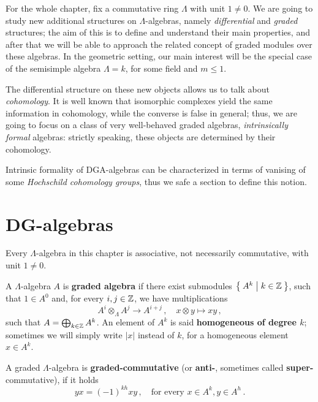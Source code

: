 
For the whole chapter, fix a commutative ring $\Lambda$ 
with unit $1 \ne 0$. We are going to study new
additional structures on $\Lambda$-algebras, 
namely \emph{differential} and \emph{graded} structures;
the aim of this is to define and understand their main properties,
and after that we will be able to
approach the related concept of graded modules over these algebras. 
In the geometric setting, our main interest will be the special case
of the semisimple algebra $\Lambda = k$,
for some field and $m \le 1$.

The differential structure on these new objects
allows us to talk about \emph{cohomology}.
It is well known that isomorphic complexes
yield the same information in cohomology,
while the converse is false in general;
thus, we are going to focus on a class of very well-behaved 
graded algebras, \emph{intrinsically formal} algebras:
strictly speaking, these objects are determined
by their cohomology. 

Intrinsic formality of DGA-algebras
can be characterized in terms of vanising
of some \emph{Hochschild cohomology groups},
thus we safe a section to define this notion.

\section{DG-algebras}

	Every $\Lambda$-algebra in this chapter is associative,
	not necessarily commutative,
	with unit $1 \ne 0$.
	
	\begin{df}
		A $\Lambda$-algebra $A$ is \textbf{graded algebra}
		if there exist submodules $\Set{A^{k} | k \in {\mathbb Z}}$,
		such that $1 \in A^{0}$ and,
		for every $i,j \in {\mathbb Z}$, we have multiplications
		\begin{equation*}
			A^{i} \otimes_{\Lambda} A^{j} \longrightarrow A^{i+j}\,,
			\quad x \otimes y \longmapsto xy\,,
		\end{equation*}
		such that $A = \bigoplus_{k \in {\mathbb Z}} A^{k}$.
		An element of $A^{k}$ is said \textbf{homogeneous of degree $k$};
		sometimes we will simply write $|x|$ instead of $k$,
		for a homogeneous element $x \in A^{k}$.
		
		A graded $\Lambda$-algebra is \textbf{graded-commutative} 
		(or \textbf{anti-}, sometimes called \textbf{super-}commutative),
		if it holds
		\begin{equation*}
			yx = (-1)^{kh} xy\,,
			\quad \text{for every } x \in A^{k}, y \in A^{h}\,.
		\end{equation*}
	\end{df}
	
